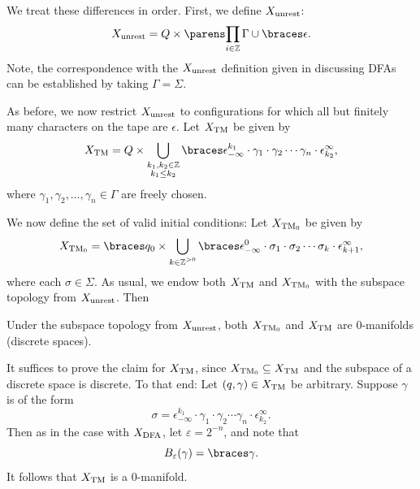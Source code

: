 \documentclass{fkpaper}
\begin{document}
\begin{multicols}{2}
We treat these differences in order. First, we define $X_{\rm
  unrest}$:
\[
  X_{\rm unrest} = Q \times \pn{\prod_{i \in \ZZ} \Gamma \cup
    \set{\epsilon}}.
\]
Note, the correspondence with the $X_{\rm unrest}$ definition given in
discussing DFAs can be established by taking $\Gamma = \Sigma$.

As before, we now restrict $X_{\rm unrest}$ to configurations for
which all but finitely many characters on the tape are $\epsilon$. Let
$X_{\rm TM}$ be given by
\[
  X_{\rm TM} = Q \times \bigcup_{\substack{k_1, k_2 \in \ZZ \\ k_1
      \leq k_2}} \set{\epsilon_{-\infty}^{k_1}\cdot \gamma_1 \cdot
    \gamma_2 \cdots \gamma_n \cdot \epsilon_{k_2}^\infty},
\]
where $\gamma_1, \gamma_2, \ldots, \gamma_n \in \Gamma$ are freely
chosen.%

We now define the set of valid initial conditions: Let $X_{\rm TM_0}$
be given by
\[
  X_{\rm TM_0} = \set{q_0} \times \bigcup_{\substack{k \in \ZZ^{> 0}}}
  \set{\epsilon_{-\infty}^{0} \cdot \sigma_1 \cdot \sigma_2 \cdots
    \sigma_{k} \cdot \epsilon_{k+1}^\infty},
\]
where each $\sigma \in \Sigma$. As usual, we endow both $X_{\rm TM}$
and $X_{\rm TM_0}$ with the subspace topology from $X_{\rm unrest}$.
Then
\begin{proposition}
  Under the subspace topology from $X_{\rm unrest}$, both $X_{\rm
    TM_0}$ and $X_{\rm TM}$ are 0-manifolds (discrete spaces).
\end{proposition}
\begin{sproof}
  It suffices to prove the claim for $X_{\rm TM}$, since $X_{\rm TM_0}
  \subseteq X_{\rm TM}$ and the subspace of a discrete space is
  discrete. To that end: Let $(q, \gamma) \in X_{\rm TM}$ be
  arbitrary. Suppose $\gamma$ is of the form
  \[
    \sigma = \epsilon_{-\infty}^{k_1} \cdot \gamma_1 \cdot \gamma_2
    \cdots \gamma_n \cdot \epsilon_{k_2}^\infty.
  \]
  Then as in the case with $X_{\rm DFA}$, let $\varepsilon = 2^{-n}$,
  and note that
  \[
    B_\varepsilon(\gamma) = \set{\gamma}.
  \]
  It follows that $X_{\rm TM}$ is a $0$-manifold.
\end{sproof}



\end{multicols}
\end{document}
